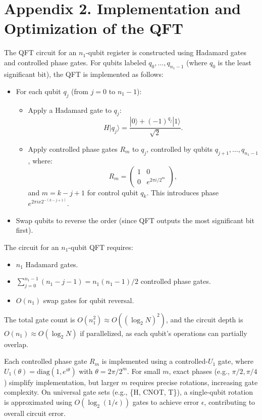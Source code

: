 \documentclass[conference,twoside]{IEEEtran}
\begin{document}
\section*{Appendix 2. Implementation and Optimization of the QFT}
The QFT circuit for an \( n_1 \)-qubit register is constructed using Hadamard gates and controlled phase gates. For qubits labeled \( q_0, \ldots, q_{n_1-1} \) (where \( q_0 \) is the least significant bit), the QFT is implemented as follows:
\begin{itemize}
    \item For each qubit \( q_j \) (from \( j = 0 \) to \( n_1-1 \)):
        \begin{itemize}
            \item Apply a Hadamard gate to \( q_j \):
            \[
            H |q_j\rangle = \frac{|0\rangle + (-1)^{q_j} |1\rangle}{\sqrt{2}}.
            \]
            \item Apply controlled phase gates \( R_m \) to \( q_j \), controlled by qubits \( q_{j+1}, \ldots, q_{n_1-1} \), where:
            \[
            R_m = \begin{pmatrix}
            1 & 0 \\
            0 & e^{2\pi i / 2^m}
            \end{pmatrix},
            \]
            and \( m = k - j + 1 \) for control qubit \( q_k \). This introduces phase \( e^{2\pi i x 2^{-(k-j+1)}} \).
        \end{itemize}
    \item Swap qubits to reverse the order (since QFT outputs the most significant bit first).
\end{itemize}
The circuit for an \( n_1 \)-qubit QFT requires:
\begin{itemize}
    \item \( n_1 \) Hadamard gates.
    \item \( \sum_{j=0}^{n_1-1} (n_1 - j - 1) = n_1 (n_1 - 1) / 2 \) controlled phase gates.
    \item \( O(n_1) \) swap gates for qubit reversal.
\end{itemize}
The total gate count is \( O(n_1^2) \approx O((\log_2 N)^2) \), and the circuit depth is \( O(n_1) \approx O(\log_2 N) \) if parallelized, as each qubit’s operations can partially overlap.

Each controlled phase gate \( R_m \) is implemented using a controlled-\( U_1 \) gate, where \( U_1(\theta) = \text{diag}(1, e^{i\theta}) \) with \( \theta = 2\pi / 2^m \). For small \( m \), exact phases (e.g., \( \pi/2, \pi/4 \)) simplify implementation, but larger \( m \) requires precise rotations, increasing gate complexity. On universal gate sets (e.g., \{H, CNOT, T\}), a single-qubit rotation is approximated using \( O(\log_2 (1/\epsilon)) \) gates to achieve error \( \epsilon \), contributing to overall circuit error.
\end{document}
